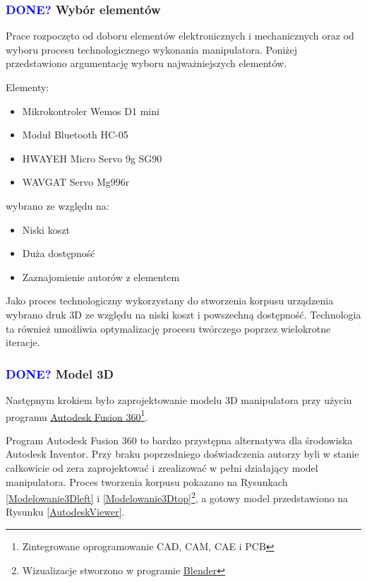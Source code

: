 \documentclass[11pt,titlepage,a4paper]{article}
\begin{document}
\subsubsection{\textcolor{blue}{DONE?} Wybór elementów}

Prace rozpoczęto od doboru elementów elektronicznych i mechanicznych oraz od wyboru procesu technologicznego wykonania manipulatora. Poniżej przedstawiono argumentację wyboru najważniejszych elementów.

\medskip

Elementy:
\begin{itemize}
    \item Mikrokontroler Wemos D1 mini
    \item Moduł Bluetooth HC-05
    \item HWAYEH Micro Servo 9g SG90
    \item WAVGAT Servo Mg996r
\end{itemize}
wybrano ze względu na:
\begin{itemize}
    \item Niski koszt
    \item Duża dostępność
    \item Zaznajomienie autorów z elementem
\end{itemize}

\medskip

Jako proces technologiczny wykorzystany do stworzenia korpusu urządzenia wybrano druk 3D ze względu na niski koszt i powszechną dostępność. Technologia ta również umożliwia optymalizację procesu twórczego poprzez wielokrotne iteracje.

\newpage

\subsubsection{\textcolor{blue}{DONE?} Model 3D}

Następnym krokiem było zaprojektowanie modelu 3D manipulatora przy użyciu programu \href{https://www.autodesk.pl/products/fusion-360}{\underline{Autodesk Fusion 360}\footnote{Zintegrowane oprogramowanie CAD, CAM, CAE i PCB}}.

Program Autodesk Fusion 360 to bardzo przystępna alternatywa dla środowiska Autodesk Inventor. Przy braku poprzedniego doświadczenia autorzy byli w stanie całkowicie od zera zaprojektować i zrealizować w pełni działający model manipulatora. Proces tworzenia korpusu pokazano na Rysunkach \ref{Modelowanie3Dleft} i \ref{Modelowanie3Dtop}\footnote{Wizualizacje stworzono w programie \href{https://www.blender.org}{\underline{Blender}}}, a gotowy model przedstawiono na Rysunku \ref{AutodeskViewer}.
\end{document}
